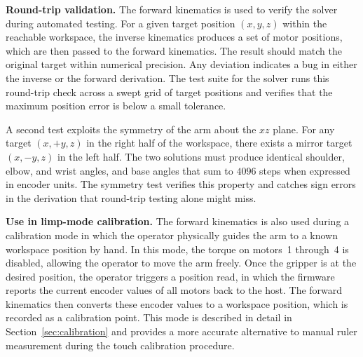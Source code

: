 \textbf{Round-trip validation.} The forward kinematics is used 
to verify the solver during automated testing. For a given 
target position $(x, y, z)$ within the reachable workspace, the 
inverse kinematics produces a set of motor positions, which are 
then passed to the forward kinematics. The result should match 
the original target within numerical precision. Any deviation 
indicates a bug in either the inverse or the forward derivation. 
The test suite for the solver runs this round-trip check across 
a swept grid of target positions and verifies that the maximum 
position error is below a small tolerance.

A second test exploits the symmetry of the arm about the $xz$ 
plane. For any target $(x, +y, z)$ in the right half of the 
workspace, there exists a mirror target $(x, -y, z)$ in the left 
half. The two solutions must produce identical shoulder, elbow, 
and wrist angles, and base angles that sum to $4096$ steps when 
expressed in encoder units. The symmetry test verifies this 
property and catches sign errors in the derivation that 
round-trip testing alone might miss.

\textbf{Use in limp-mode calibration.} The forward kinematics is 
also used during a calibration mode in which the operator 
physically guides the arm to a known workspace position by hand. 
In this mode, the torque on motors~1 through~4 is disabled, 
allowing the operator to move the arm freely. Once the gripper 
is at the desired position, the operator triggers a position 
read, in which the firmware reports the current encoder values 
of all motors back to the host. The forward kinematics then 
converts these encoder values to a workspace position, which is 
recorded as a calibration point. This mode is described in detail 
in Section~\ref{sec:calibration} and provides a more accurate alternative to manual 
ruler measurement during the touch calibration procedure.
